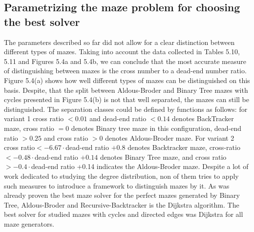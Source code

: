 \subsection{Parametrizing the maze problem for choosing the best solver}
The parameters described so far did not allow for a clear distinction between different types of mazes. Taking into account the data collected in Tables 5.10, 5.11 and Figures 5.4a and 5.4b,
we can conclude that the most accurate measure of distinguishing between mazes is the cross number to a dead-end number ratio.
Figure 5.4(a) shows how well different types of mazes can be distinguished on this basis. Despite, that the split between Aldous-Broder and Binary Tree
mazes with cycles presented in Figure 5.4(b) is not that well separated, the mazes can still be distinguished. 
The separation classes could be defined by functions as follows: for variant 1 cross ratio $< 0.01$ and dead-end ratio $< 0.14$ denotes BackTracker maze,
cross ratio $= 0$ denotes Binary tree maze in this configuration, dead-end ratio $> 0.25$ and cross ratio $> 0$ denotes Aldous-Broder maze.
For variant 2 cross ratio$ < -6.67\cdot$dead-end ratio $+ 0.8$ denotes Backtracker maze, cross-ratio $< -0.48\cdot$dead-end ratio $+0.14$ denotes Binary Tree maze, 
and cross ratio$ > -0.4\cdot$dead-end ratio +0.14 indicates the Aldous-Broder maze.
Despite a lot of work dedicated to studying the degree distribution, non of them tries to apply such measures to introduce a framework to distinguish mazes by it.
As was already proven the best maze solver for the perfect mazes generated by Binary Tree, Aldous-Broder and Recursive-Backtracker is the Dijkstra algorithm.
The best solver for studied mazes with cycles and directed edges was Dijkstra for all maze generators.
